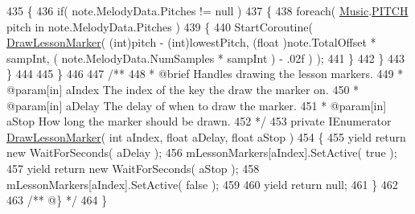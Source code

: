 \begin{DoxyCodeInclude}
435         \{
436             \textcolor{keywordflow}{if}( note.MelodyData.Pitches != null )
437             \{
438                 \textcolor{keywordflow}{foreach}( \hyperlink{class_music}{Music}.\hyperlink{group___music_enums_ga508f69b199ea518f935486c990edac1d}{PITCH} pitch in note.MelodyData.Pitches )
439                 \{
440                     StartCoroutine( \hyperlink{group___key_contain_handlers_gac6b82feca83eaf5e3ce6901088bc552c}{DrawLessonMarker}( (\textcolor{keywordtype}{int})pitch - (\textcolor{keywordtype}{int})lowestPitch, (\textcolor{keywordtype}{float}
      )note.TotalOffset * sampInt, ( note.MelodyData.NumSamples * sampInt ) - .02f ) );
441                 \}
442             \}
443         \}
444 
445     \}
446 \textcolor{comment}{}
447 \textcolor{comment}{    /**}
448 \textcolor{comment}{     * @brief Handles drawing the lesson markers.}
449 \textcolor{comment}{     * @param[in] aIndex The index of the key the draw the marker on.}
450 \textcolor{comment}{     * @param[in] aDelay The delay of when to draw the marker.}
451 \textcolor{comment}{     * @param[in] aStop How long the marker should be drawn.}
452 \textcolor{comment}{    */}
453     \textcolor{keyword}{private} IEnumerator \hyperlink{group___key_contain_handlers_gac6b82feca83eaf5e3ce6901088bc552c}{DrawLessonMarker}( \textcolor{keywordtype}{int} aIndex, \textcolor{keywordtype}{float} aDelay, \textcolor{keywordtype}{float} aStop )
454     \{
455         yield \textcolor{keywordflow}{return} \textcolor{keyword}{new} WaitForSeconds( aDelay );
456         mLessonMarkers[aIndex].SetActive( \textcolor{keyword}{true} );
457         yield \textcolor{keywordflow}{return} \textcolor{keyword}{new} WaitForSeconds( aStop );
458         mLessonMarkers[aIndex].SetActive( \textcolor{keyword}{false} );
459 
460         yield \textcolor{keywordflow}{return} null;
461     \}
462 \textcolor{comment}{}
463 \textcolor{comment}{    /** @\} */}
464 \}
\end{DoxyCodeInclude}
 